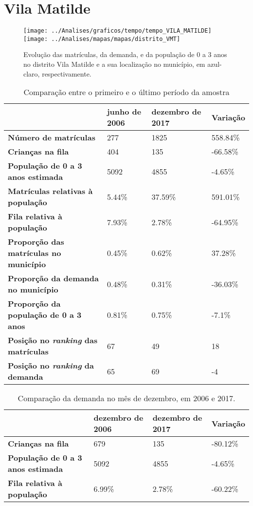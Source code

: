 \section{Vila Matilde}
\begin{figure}[H]
\centering
\texttt{[image: ../Analises/graficos/tempo/tempo\_VILA\_MATILDE]}
\texttt{[image: ../Analises/mapas/mapas/distrito\_VMT]}
\caption{Evolução das matrículas, da demanda, e da população de 0 a 3 anos no distrito Vila Matilde e a sua localização no município, em azul-claro, respectivamente.}
\end{figure}
\begin{table}[H]
\begin{tabular}{l|l|l|l}
\textbf{}                                      & \textbf{junho de 2006}       & \textbf{dezembro de 2017}    & \textbf{Variação} \\ \hline
\textbf{Número de matrículas}                  & 277 & 1825 & 558.84\% \\ \hline
\textbf{Crianças na fila}                      & 404 & 135 & -66.58\% \\ \hline
\textbf{População de 0 a 3 anos estimada}      & 5092 & 4855 & -4.65\% \\ \hline
\textbf{Matrículas relativas à população}      & 5.44\% & 37.59\% & 591.01\% \\ \hline
\textbf{Fila relativa à população}             & 7.93\% & 2.78\% & -64.95\% \\ \hline
\textbf{Proporção das matrículas no município} & 0.45\% & 0.62\% & 37.28\% \\ \hline
\textbf{Proporção da demanda no município}     & 0.48\% & 0.31\% & -36.03\% \\ \hline
\textbf{Proporção da população de 0 a 3 anos}  & 0.81\% & 0.75\% & -7.1\% \\ \hline
\textbf{Posição no \textit{ranking} das matrículas}     & 67 & 49 & 18 \\ \hline
\textbf{Posição no \textit{ranking} da demanda}         & 65 & 69 & -4 \\ 
\end{tabular}
\caption{Comparação entre o primeiro e o último período da amostra}
\end{table}
\begin{table}[H]
\begin{tabular}{l|l|l|l}
\textbf{}                                 & \textbf{dezembro de 2006} & \textbf{dezembro de 2017} & \textbf{Variação} \\ \hline
\textbf{Crianças na fila}                      & 679 & 135 & -80.12\% \\ \hline
\textbf{População de 0 a 3 anos estimada}      & 5092 & 4855 & -4.65\% \\ \hline
\textbf{Fila relativa à população}             & 6.99\% & 2.78\% & -60.22\% \\
\end{tabular}
\caption{Comparação da demanda no mês de dezembro, em 2006 e 2017.}
\end{table}
